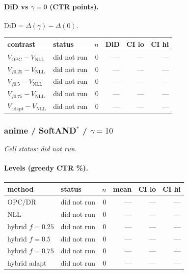 \documentclass[10pt,a4paper]{article}
\begin{document}
\paragraph{DiD vs $\gamma=0$ (CTR points).} $\mathrm{DiD}=\Delta(\gamma)-\Delta(0)$.
{\centering\small\begin{tabular}{llrrrr}
\toprule contrast & status & $n$ & DiD & CI lo & CI hi \\
\midrule
$V_{\mathrm{OPC}}-V_{\mathrm{NLL}}$ & did not run & 0 & --- & --- & --- \\
$V_{f0.25}-V_{\mathrm{NLL}}$ & did not run & 0 & --- & --- & --- \\
$V_{f0.5}-V_{\mathrm{NLL}}$ & did not run & 0 & --- & --- & --- \\
$V_{f0.75}-V_{\mathrm{NLL}}$ & did not run & 0 & --- & --- & --- \\
$V_{\mathrm{adapt}}-V_{\mathrm{NLL}}$ & did not run & 0 & --- & --- & --- \\
\bottomrule\end{tabular}\par}
\bigskip
\subsubsection{anime / SoftAND$^*$ / $\gamma=10$}
\emph{Cell status: did not run}.
\paragraph{Levels (greedy CTR \%).}
{\centering\small\begin{tabular}{llrrrr}
\toprule method & status & $n$ & mean & CI lo & CI hi \\
\midrule
OPC/DR & did not run & 0 & --- & --- & --- \\
NLL & did not run & 0 & --- & --- & --- \\
hybrid $f{=}0.25$ & did not run & 0 & --- & --- & --- \\
hybrid $f{=}0.5$ & did not run & 0 & --- & --- & --- \\
hybrid $f{=}0.75$ & did not run & 0 & --- & --- & --- \\
hybrid adapt & did not run & 0 & --- & --- & --- \\
\bottomrule\end{tabular}\par}
\end{document}
